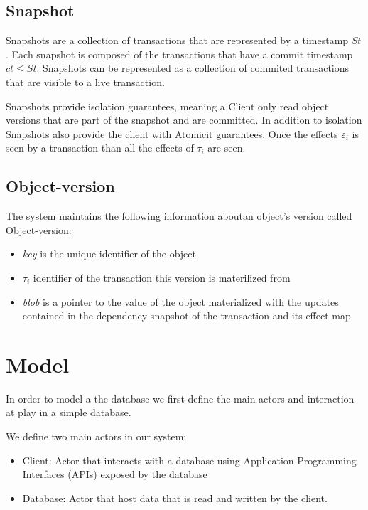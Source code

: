 \documentclass[parallelisme]{compas2022}
\begin{document}
\subsection{Snapshot}

Snapshots are a collection of transactions that are represented by a timestamp $St$.
Each snapshot is composed of the transactions that have a commit timestamp $ct \leq St$. 
Snapshots can be represented as a collection of commited transactions that are visible to a live transaction.

Snapshots provide isolation guarantees, meaning a Client only read object versions that are part of the snapshot and are committed. 
In addition to isolation Snapshots also provide the client with Atomicit guarantees.
Once the effects $\varepsilon_i$ is seen by a transaction than all the effects of $\tau_i$ are seen.

\subsection{Object-version}

The system maintains the following information aboutan object's version called Object-version: 
\begin{itemize}
  \item \emph{key} is the unique identifier of the object
  \item \emph{$\tau_i$} identifier of the transaction this version is materilized from
  \item \emph{blob} is a pointer to the value of the object materialized with the updates contained in the dependency snapshot of the transaction and its effect map
\end{itemize}



\section{Model}

In order to model a the database we first define the main actors and interaction at play in a simple database.

We define two main actors in our system:
\begin{itemize}
  \item Client: Actor that interacts with a database using Application Programming Interfaces (APIs) exposed by the database
  \item Database: Actor that host data that is read and written by the client.
\end{itemize}
\end{document}
